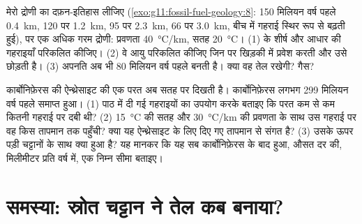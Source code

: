 \begin{exercise}[$\star\star\star$]\label{exo:g11:fossil-fuel-geology:14}
मेरो द्रोणी का दफ़न-इतिहास लीजिए (\cref{exo:g11:fossil-fuel-geology:8}:
150 मिलियन वर्ष पहले \qty{0.4}{km}, 120 पर \qty{1.2}{km}, 95 पर \qty{2.3}{km},
66 पर \qty{3.0}{km}, बीच में गहराई स्थिर रूप से बढ़ती हुई), पर एक
अधिक गरम द्रोणी: प्रवणता \qty{40}{\degreeCelsius/km}, सतह
\qty{20}{\degreeCelsius}। (1)  के शीर्ष और आधार की
गहराइयाँ परिकलित कीजिए। (2) वे आयु परिकलित कीजिए जिन पर  खिड़की में प्रवेश करती और
उसे छोड़ती है। (3) अपनति अब भी 80 मिलियन वर्ष पहले बनती है। क्या
वह तेल रखेगी? गैस?
\end{exercise}

\begin{exercise}[$\star\star\star$]\label{exo:g11:fossil-fuel-geology:15}
कार्बोनिफ़ेरस की ऐन्थ्रेसाइट की एक परत अब सतह पर दिखती है।
कार्बोनिफ़ेरस लगभग 299 मिलियन वर्ष पहले समाप्त हुआ। (1) पाठ में दी गई गहराइयों का उपयोग करके बताइए
कि परत कम से कम कितनी गहराई पर दबी थी? (2)
\qty{15}{\degreeCelsius} की सतह और \qty{30}{\degreeCelsius/km} की प्रवणता के साथ
उस गहराई पर वह किस तापमान तक पहुँची? क्या यह ऐन्थ्रेसाइट के लिए दिए गए
तापमान से संगत है? (3) उसके ऊपर पड़ी चट्टानों के साथ क्या हुआ है? यह मानकर कि यह सब
कार्बोनिफ़ेरस के बाद हुआ, औसत दर की, मिलीमीटर प्रति वर्ष में, एक निम्न सीमा बताइए।
\end{exercise}

\section{समस्या: स्रोत चट्टान ने तेल कब बनाया?}

